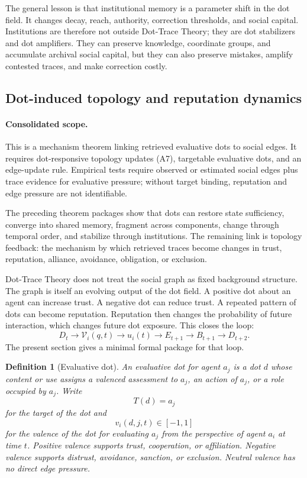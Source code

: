 \documentclass[11pt]{article}
\newtheorem{definition}{Definition}
\theoremstyle{remark}
\begin{document}
The general lesson is that institutional memory is a parameter shift in
the dot field. It changes decay, reach, authority, correction thresholds,
and social capital. Institutions are therefore not outside Dot-Trace
Theory; they are dot stabilizers and dot amplifiers. They can preserve
knowledge, coordinate groups, and accumulate archival social capital,
but they can also preserve mistakes, amplify contested traces, and make
correction costly.

\subsection{Dot-induced topology and reputation dynamics}\label{dot-induced-topology-and-reputation}

\paragraph{Consolidated scope.} This is a mechanism theorem linking retrieved evaluative dots to social edges. It requires dot-responsive topology updates (A7), targetable evaluative dots, and an edge-update rule. Empirical tests require observed or estimated social edges plus trace evidence for evaluative pressure; without target binding, reputation and edge pressure are not identifiable.

The preceding theorem packages show that dots can restore state
sufficiency, converge into shared memory, fragment across components,
change through temporal order, and stabilize through institutions. The
remaining link is topology feedback: the mechanism by which retrieved
traces become changes in trust, reputation, alliance, avoidance,
obligation, or exclusion.

Dot-Trace Theory does not treat the social graph as fixed background
structure. The graph is itself an evolving output of the dot field. A
positive dot about an agent can increase trust. A negative dot can reduce
trust. A repeated pattern of dots can become reputation. Reputation then
changes the probability of future interaction, which changes future dot
exposure. This closes the loop:
$$
D_t \rightarrow \mathcal V_i(q,t) \rightarrow u_i(t) \rightarrow E_{t+1}
\rightarrow B_{t+1} \rightarrow D_{t+2}.
$$
The present section gives a minimal formal package for that loop.

\begin{definition}[Evaluative dot]\label{def:evaluative-dot}
An evaluative dot for agent $a_j$ is a dot $d$ whose content or use
assigns a valenced assessment to $a_j$, an action of $a_j$, or a role
occupied by $a_j$. Write
$$
T(d)=a_j
$$
for the target of the dot and
$$
v_i(d,j,t)\in[-1,1]
$$
for the valence of the dot for evaluating $a_j$ from the perspective of
agent $a_i$ at time $t$. Positive valence supports trust, cooperation,
or affiliation. Negative valence supports distrust, avoidance, sanction,
or exclusion. Neutral valence has no direct edge pressure.
\end{definition}
\end{document}
